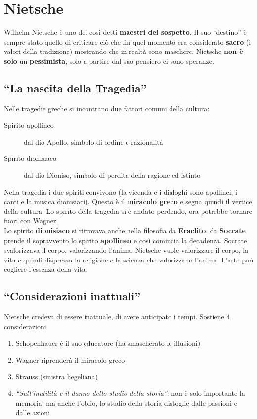 
\section{Nietsche}
Wilhelm Nietsche è uno dei così detti \textbf{maestri del sospetto}. Il suo ``destino'' è sempre 
stato quello di criticare ciò che fin quel momento era considerato \textbf{sacro} (i valori della
tradizione) mostrando che in realtà sono maschere. Nietsche \textbf{non è solo} un 
\textbf{pessimista}, solo a partire dal suo pensiero ci sono speranze.

\subsection{``La nascita della Tragedia''}
Nelle tragedie greche si incontrano due fattori comuni della cultura:
\begin{description}
  \item[Spirito apollineo] dal dio Apollo, simbolo di ordine e razionalità
  \item[Spirito dionisiaco] dal dio Dioniso, simbolo di perdita della ragione ed istinto
\end{description}
Nella tragedia i due spiriti convivono (la vicenda e i dialoghi sono apollinei, i canti e la musica
dionisiaci). Questo è il \textbf{miracolo greco} e segna quindi il vertice della cultura. Lo spirito
della tragedia si è andato perdendo, ora potrebbe tornare fuori con Wagner.\\ [\baselineskip]
Lo spirito \textbf{dionisiaco} si ritrovava anche nella filosofia da \textbf{Eraclito}, da 
\textbf{Socrate} prende il sopravvento lo spirito \textbf{apollineo} e così comincia la decadenza.
Socrate svalorizzava il corpo, valorizzando l'anima. Nietsche vuole valorizzare il corpo, la vita
e quindi disprezza la religione e la scienza che valorizzano l'anima. L'arte può cogliere l'essenza 
della vita.

\subsection{``Considerazioni inattuali''}
Nietsche credeva di essere inattuale, di avere anticipato i tempi. Sostiene 4 considerazioni
\begin{enumerate}
  \item Schopenhauer è il suo educatore (ha smascherato le illusioni)
  \item Wagner riprenderà il miracolo greco
  \item Strauss (sinistra hegeliana)
  \item \textit{``Sull'inutilità e il danno dello studio della storia''}: non è solo importante la
    memoria, ma anche l'oblio, lo studio della storia distoglie dalle passioni e dalle azioni
\end{enumerate}

